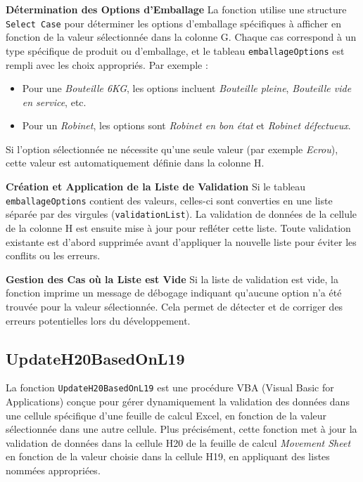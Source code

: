 \documentclass[a4paper, oneside, 12pt, final]{extreport}
\begin{document}
\textbf{Détermination des Options d'Emballage}
La fonction utilise une structure \texttt{Select Case} pour déterminer les options d'emballage spécifiques à afficher en fonction de la valeur sélectionnée dans la colonne G. Chaque cas correspond à un type spécifique de produit ou d'emballage, et le tableau \texttt{emballageOptions} est rempli avec les choix appropriés. Par exemple :

\begin{itemize}
    \item Pour une \textit{Bouteille 6KG}, les options incluent \textit{Bouteille pleine}, \textit{Bouteille vide en service}, etc.
    \item Pour un \textit{Robinet}, les options sont \textit{Robinet en bon état} et \textit{Robinet défectueux}.
\end{itemize}

Si l'option sélectionnée ne nécessite qu'une seule valeur (par exemple \textit{Ecrou}), cette valeur est automatiquement définie dans la colonne H.

\textbf{Création et Application de la Liste de Validation}
Si le tableau \texttt{emballageOptions} contient des valeurs, celles-ci sont converties en une liste séparée par des virgules (\texttt{validationList}). La validation de données de la cellule de la colonne H est ensuite mise à jour pour refléter cette liste. Toute validation existante est d'abord supprimée avant d'appliquer la nouvelle liste pour éviter les conflits ou les erreurs.

\textbf{Gestion des Cas où la Liste est Vide}
Si la liste de validation est vide, la fonction imprime un message de débogage indiquant qu'aucune option n'a été trouvée pour la valeur sélectionnée. Cela permet de détecter et de corriger des erreurs potentielles lors du développement.


\subsection{UpdateH20BasedOnL19}
La fonction \texttt{UpdateH20BasedOnL19} est une procédure VBA (Visual Basic for Applications) conçue pour gérer dynamiquement la validation des données dans une cellule spécifique d'une feuille de calcul Excel, en fonction de la valeur sélectionnée dans une autre cellule. Plus précisément, cette fonction met à jour la validation de données dans la cellule H20 de la feuille de calcul \textit{Movement Sheet} en fonction de la valeur choisie dans la cellule H19, en appliquant des listes nommées appropriées.
\end{document}
